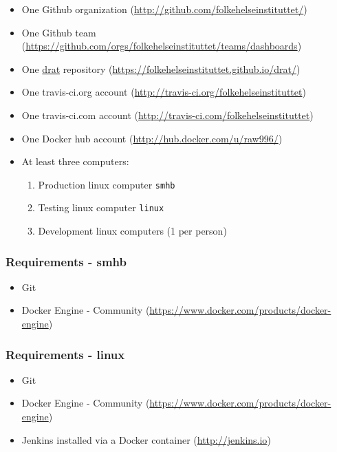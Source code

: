 \documentclass[12pt,]{article}
\providecommand{\tightlist}{%
  \setlength{\itemsep}{0pt}\setlength{\parskip}{0pt}}
\begin{document}
\begin{itemize}
\tightlist
\item
  One Github organization
  (\url{http://github.com/folkehelseinstituttet/})
\item
  One Github team
  (\url{https://github.com/orgs/folkehelseinstituttet/teams/dashboards})
\item
  One \href{https://github.com/eddelbuettel/drat}{drat} repository
  (\url{https://folkehelseinstituttet.github.io/drat/})
\item
  One travis-ci.org account
  (\url{http://travis-ci.org/folkehelseinstituttet})
\item
  One travis-ci.com account
  (\url{http://travis-ci.com/folkehelseinstituttet})
\item
  One Docker hub account (\url{http://hub.docker.com/u/raw996/})
\item
  At least three computers:

  \begin{enumerate}
  \def\labelenumi{\arabic{enumi}.}
  \tightlist
  \item
    Production linux computer \texttt{smhb}
  \item
    Testing linux computer \texttt{linux}
  \item
    Development linux computers (1 per person)
  \end{enumerate}
\end{itemize}

\subsubsection{Requirements - smhb}\label{requirements---smhb}

\begin{itemize}
\tightlist
\item
  Git
\item
  Docker Engine - Community
  (\url{https://www.docker.com/products/docker-engine})
\end{itemize}

\subsubsection{Requirements - linux}\label{requirements---linux}

\begin{itemize}
\tightlist
\item
  Git
\item
  Docker Engine - Community
  (\url{https://www.docker.com/products/docker-engine})
\item
  Jenkins installed via a Docker container (\url{http://jenkins.io})
\end{itemize}
\end{document}
